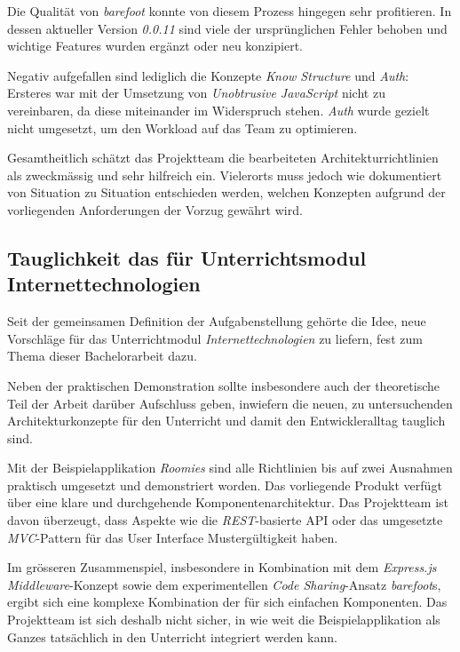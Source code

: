Die Qualität von \emph{barefoot} konnte von diesem Prozess hingegen sehr profitieren. In dessen aktueller Version \emph{0.0.11} sind viele der ursprünglichen Fehler behoben und wichtige Features wurden ergänzt oder neu konzipiert.

Negativ aufgefallen sind lediglich die Konzepte \emph{Know Structure} und \emph{Auth}: Ersteres war mit der Umsetzung von \emph{Unobtrusive JavaScript} nicht zu vereinbaren, da diese miteinander im Widerspruch stehen. \emph{Auth} wurde gezielt nicht umgesetzt, um den Workload auf das Team zu optimieren.

Gesamtheitlich schätzt das Projektteam die bearbeiteten Architekturrichtlinien als zweckmässig und sehr hilfreich ein. Vielerorts muss jedoch wie dokumentiert von Situation zu Situation entschieden werden, welchen Konzepten aufgrund der vorliegenden Anforderungen der Vorzug gewährt wird.


\subsection*{Tauglichkeit das für Unterrichtsmodul Internettechnologien}

Seit der gemeinsamen Definition der Aufgabenstellung gehörte die Idee, neue Vorschläge für das Unterrichtmodul \emph{Internettechnologien} zu liefern, fest zum Thema dieser Bachelorarbeit dazu.

Neben der praktischen Demonstration sollte insbesondere auch der theoretische Teil der Arbeit darüber Aufschluss geben, inwiefern die neuen, zu untersuchenden Architekturkonzepte für den Unterricht und damit den Entwickleralltag tauglich sind.

Mit der Beispielapplikation \emph{Roomies} sind alle Richtlinien bis auf zwei Ausnahmen praktisch umgesetzt und demonstriert worden. Das vorliegende Produkt verfügt über eine klare und durchgehende Komponentenarchitektur. Das Projektteam ist davon überzeugt, dass Aspekte wie die \emph{REST}-basierte API oder das umgesetzte \emph{MVC}-Pattern für das User Interface Mustergültigkeit haben.

Im grösseren Zusammenspiel, insbesondere in Kombination mit dem \emph{Express.js Middleware}-Konzept sowie dem experimentellen \emph{Code Sharing}-Ansatz \emph{barefoot}s, ergibt sich eine komplexe Kombination der für sich einfachen Komponenten. Das Projektteam ist sich deshalb nicht sicher, in wie weit die Beispielapplikation als Ganzes tatsächlich in den Unterricht integriert werden kann.


